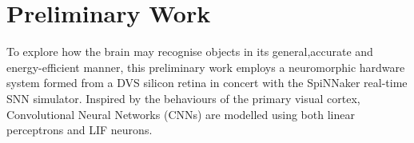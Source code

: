 \documentclass[journal]{journal}
\begin{document}
%
%
%
\section{Preliminary Work}
To explore how the brain may recognise objects in its general,accurate and energy-efficient manner, this preliminary work employs a neuromorphic hardware system formed from a DVS silicon retina in concert with the SpiNNaker real-time SNN simulator.
Inspired by the behaviours of the primary visual cortex, Convolutional Neural Networks (CNNs) are modelled using both linear perceptrons and LIF neurons.
\end{document}
